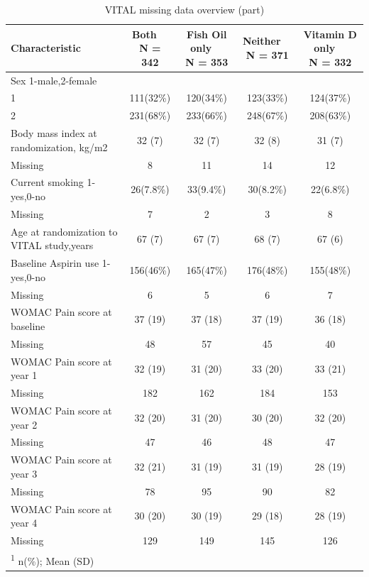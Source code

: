 \documentclass{article}
\begin{document}
\begin{table}[!h]
\centering
\caption{VITAL missing data overview (part)}
\centering
\begin{tabular}[t]{l|c|c|c|c}
\hline
\textbf{Characteristic} & \makecell[c]{\textbf{Both}\ \ \\N = 342} & \makecell[c]{\textbf{Fish Oil only}\ \ \\N = 353} & \makecell[c]{\textbf{Neither}\ \ \\N = 371} & \makecell[c]{\textbf{Vitamin D only}\ \ \\N = 332}\\
\hline
Sex 1-male,2-female &  &  &  & \\
\hline
\hspace{1em}1 & 111(32\%) & 120(34\%) & 123(33\%) & 124(37\%)\\
\hline
\hspace{1em}2 & 231(68\%) & 233(66\%) & 248(67\%) & 208(63\%)\\
\hline
Body mass index at randomization, kg/m2 & 32 (7) & 32 (7) & 32 (8) & 31 (7)\\
\hline
\hspace{1em}Missing & 8 & 11 & 14 & 12\\
\hline
Current smoking 1-yes,0-no & 26(7.8\%) & 33(9.4\%) & 30(8.2\%) & 22(6.8\%)\\
\hline
\hspace{1em}Missing & 7 & 2 & 3 & 8\\
\hline
Age at randomization to VITAL study,years & 67 (7) & 67 (7) & 68 (7) & 67 (6)\\
\hline
Baseline Aspirin use 1-yes,0-no & 156(46\%) & 165(47\%) & 176(48\%) & 155(48\%)\\
\hline
\hspace{1em}Missing & 6 & 5 & 6 & 7\\
\hline
WOMAC Pain score at baseline & 37 (19) & 37 (18) & 37 (19) & 36 (18)\\
\hline
\hspace{1em}Missing & 48 & 57 & 45 & 40\\
\hline
WOMAC Pain score at year 1 & 32 (19) & 31 (20) & 33 (20) & 33 (21)\\
\hline
\hspace{1em}Missing & 182 & 162 & 184 & 153\\
\hline
WOMAC Pain score at year 2 & 32 (20) & 31 (20) & 30 (20) & 32 (20)\\
\hline
\hspace{1em}Missing & 47 & 46 & 48 & 47\\
\hline
WOMAC Pain score at year 3 & 32 (21) & 31 (19) & 31 (19) & 28 (19)\\
\hline
\hspace{1em}Missing & 78 & 95 & 90 & 82\\
\hline
WOMAC Pain score at year 4 & 30 (20) & 30 (19) & 29 (18) & 28 (19)\\
\hline
\hspace{1em}Missing & 129 & 149 & 145 & 126\\
\hline
\multicolumn{5}{l}{\rule{0pt}{1em}\textsuperscript{1} n(\%); Mean (SD)}\\
\end{tabular}
\end{table}
\end{document}

